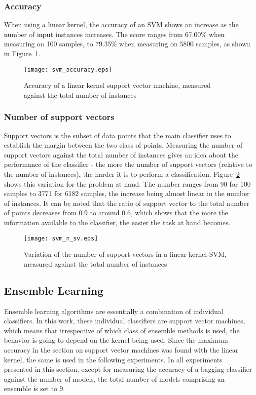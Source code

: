 \subsubsection{Accuracy}
When using a linear kernel, the accuracy of an SVM shows an increase as the number of input instances increases. The score ranges from 67.00\% when measuring on 100 samples, to 79.35\% when measuring on 5800 samples, as shown in Figure~\ref{fig:svm_accuracy}.

\begin{figure}
    \centering
    \texttt{[image: svm\_accuracy.eps]}
    \caption{Accuracy of a linear kernel support vector machine, measured against the total number of instances}
    \label{fig:svm_accuracy}
\end{figure}

\subsubsection{Number of support vectors}
Support vectors is the subset of data points that the main classifier uses to establish the margin between the two class of points. Measuring the number of support vectors against the total number of instances gives an idea about the performance of the classifier - the more the number of support vectors (relative to the number of instances), the harder it is to perform a classification. Figure~\ref{fig:svm_n_sv} shows this variation for the problem at hand. The number ranges from 90 for 100 samples to 3771 for 6182 samples, the increase being almost linear in the number of instances. It can be noted that the ratio of support vector to the total number of points decreases from 0.9 to around 0.6, which shows that the more the information available to the classifier, the easier the task at hand becomes.

\begin{figure}
    \centering
    \texttt{[image: svm\_n\_sv.eps]}
    \caption{Variation of the number of support vectors in a linear kernel SVM, measured against the total number of instances}
    \label{fig:svm_n_sv}
\end{figure}

\subsection{Ensemble Learning}
Ensemble learning algorithms are essentially a combination of individual classifiers. In this work, these individual classifiers are support vector machines, which means that irrespective of which class of ensemble methods is used, the behavior is going to depend on the kernel being used. Since the maximum accuracy in the section on support vector machines was found with the linear kernel, the same is used in the following experiments. In all experiments presented in this section, except for measuring the accuracy of a bagging classifier against the number of models, the total number of models comprising an ensemble is set to 9.

